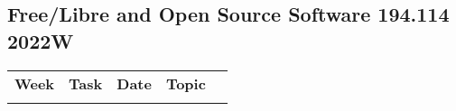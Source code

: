 \documentclass[a4paper]{article}
\def\mytitle{Free/Libre and Open Source Software 194.114 2022W}
\begin{document}
\begin{center}
  \section*{\mytitle}
\end{center}
\thispagestyle{fancy}

\begin{longtable}{@{}ll@{~~}rlr@{}}
\textbf{Week} & \textbf{Task} & \textbf{Date} & \textbf{Topic} \\
\\[-2.1ex]

\end{longtable}

\doclicenseThis
\end{document}
